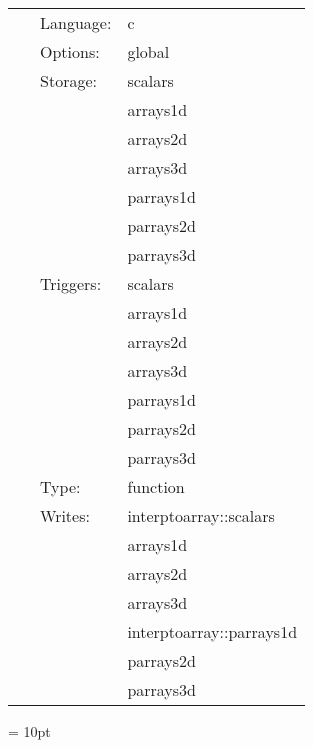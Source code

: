  \begin{tabular*}{160mm}{cll} 
~ & Language:  & c \\ 
~ & Options:  & global \\ 
~ & Storage:  & scalars \\ 
~& ~ &arrays1d\\ 
~& ~ &arrays2d\\ 
~& ~ &arrays3d\\ 
~& ~ &parrays1d\\ 
~& ~ &parrays2d\\ 
~& ~ &parrays3d\\ 
~ & Triggers:  & scalars \\ 
~& ~ &arrays1d\\ 
~& ~ &arrays2d\\ 
~& ~ &arrays3d\\ 
~& ~ &parrays1d\\ 
~& ~ &parrays2d\\ 
~& ~ &parrays3d\\ 
~ & Type:  & function \\ 
~ & Writes:  & interptoarray::scalars \\ 
~& ~ &arrays1d\\ 
~& ~ &arrays2d\\ 
~& ~ &arrays3d\\ 
~& ~ &interptoarray::parrays1d\\ 
~& ~ &parrays2d\\ 
~& ~ &parrays3d\\ 
\end{tabular*} 



\vspace{5mm}\parskip = 10pt 


